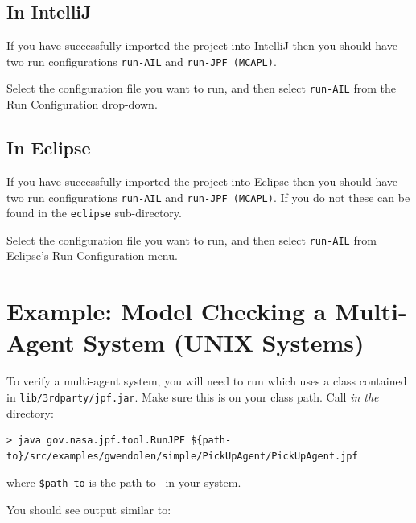 \subsection{In IntelliJ}
If you have successfully imported the project into IntelliJ then you should have two run configurations \texttt{run-AIL} and \texttt{run-JPF (MCAPL)}.  

Select the configuration file you want to run, and then select \texttt{run-AIL} from the Run Configuration drop-down.

\subsection{In Eclipse}

If you have successfully imported the project into Eclipse then you should have two run configurations \texttt{run-AIL} and \texttt{run-JPF (MCAPL)}.  If you do not these can be found in the \texttt{eclipse} sub-directory.

Select the configuration file you want to run, and then select \texttt{run-AIL} from Eclipse's Run Configuration menu.


\section{Example: Model Checking a Multi-Agent System (UNIX Systems)}

To verify a multi-agent system, you will need to run \jpf which uses a class contained in \texttt{lib/3rdparty/jpf.jar}.  Make sure this is on your class path.  Call \emph{in the \ajpfversion} directory:

\noindent \begin{lstlisting}[basicstyle=\tiny]
> java gov.nasa.jpf.tool.RunJPF ${path-to}/src/examples/gwendolen/simple/PickUpAgent/PickUpAgent.jpf
\end{lstlisting}
\medskip

\noindent where \texttt{\${path-to}} is the path to \ajpfversion\ in your system.

You should see output similar to: 


